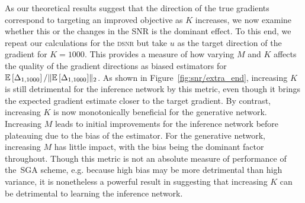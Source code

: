 As our theoretical results suggest that the direction of the true gradients correspond to
targeting an improved objective 
as $K$ increases, we now examine whether this or the changes in
the \gls{SNR} is the dominant effect.  To this end, we repeat our calculations for
the \textsc{dsnr} but take $u$ as the target direction of the gradient for $K=1000$. 
This provides a measure of how varying $M$ and $K$ affects the quality of the gradient directions
as biased estimators for $\mathbb{E}\left[\Delta_{1,1000}\right]
/\lVert\mathbb{E}\left[\Delta_{1,1000}\right]\rVert_2$.  As shown in Figure~\ref{fig:snr/extra_end}, increasing $K$ is still detrimental for the inference network
by this metric, even though
it brings the expected gradient estimate closer to the target gradient.  By contrast, increasing
$K$ is now monotonically beneficial for the generative network.  Increasing $M$
leads to initial improvements for the inference network before plateauing due to the bias 
of the estimator.  For the generative network, increasing $M$ has little impact, with the bias being
the dominant factor throughout.  Though this metric is not an absolute measure of
performance of the~\gls{SGA} scheme, e.g. because high bias may be more detrimental than high variance,
it is nonetheless a powerful result in suggesting that increasing $K$ can be detrimental
to learning the inference network.


